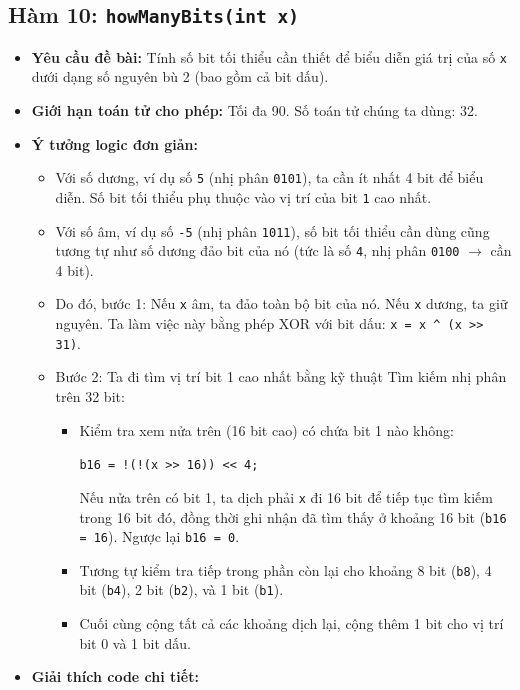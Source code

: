 \documentclass[12pt, a4paper]{article}
\begin{document}
\subsection{Hàm 10: \texttt{howManyBits(int x)}}
\begin{itemize}
    \item \textbf{Yêu cầu đề bài:} Tính số bit tối thiểu cần thiết để biểu diễn giá trị của số \texttt{x} dưới dạng số nguyên bù 2 (bao gồm cả bit dấu).
    \item \textbf{Giới hạn toán tử cho phép:} Tối đa 90. Số toán tử chúng ta dùng: 32.
    \item \textbf{Ý tưởng logic đơn giản:}
    \begin{itemize}
        \item Với số dương, ví dụ số \texttt{5} (nhị phân \texttt{0101}), ta cần ít nhất 4 bit để biểu diễn. Số bit tối thiểu phụ thuộc vào vị trí của bit \texttt{1} cao nhất.
        \item Với số âm, ví dụ số \texttt{-5} (nhị phân \texttt{1011}), số bit tối thiểu cần dùng cũng tương tự như số dương đảo bit của nó (tức là số \texttt{4}, nhị phân \texttt{0100} $\rightarrow$ cần 4 bit).
        \item Do đó, bước 1: Nếu \texttt{x} âm, ta đảo toàn bộ bit của nó. Nếu \texttt{x} dương, ta giữ nguyên. Ta làm việc này bằng phép XOR với bit dấu: \texttt{x = x \textasciicircum\ (x >> 31)}.
        \item Bước 2: Ta đi tìm vị trí bit 1 cao nhất bằng kỹ thuật Tìm kiếm nhị phân trên 32 bit:
        \begin{itemize}
            \item Kiểm tra xem nửa trên (16 bit cao) có chứa bit 1 nào không:
            
            \texttt{b16 = !(!(x >> 16)) << 4;}
            
            Nếu nửa trên có bit 1, ta dịch phải \texttt{x} đi 16 bit để tiếp tục tìm kiếm trong 16 bit đó, đồng thời ghi nhận đã tìm thấy ở khoảng 16 bit (\texttt{b16 = 16}). Ngược lại \texttt{b16 = 0}.
            \item Tương tự kiểm tra tiếp trong phần còn lại cho khoảng 8 bit (\texttt{b8}), 4 bit (\texttt{b4}), 2 bit (\texttt{b2}), và 1 bit (\texttt{b1}).
            \item Cuối cùng cộng tất cả các khoảng dịch lại, cộng thêm 1 bit cho vị trí bit 0 và 1 bit dấu.
        \end{itemize}
    \end{itemize}
    \item \textbf{Giải thích code chi tiết:}



\end{itemize}
\end{document}
